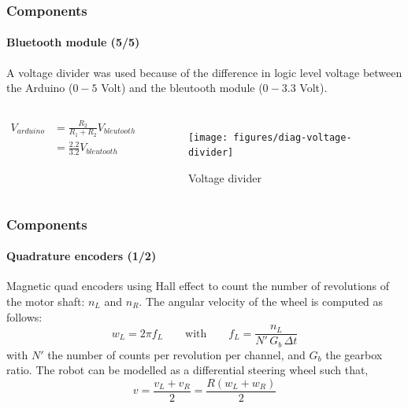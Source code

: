 \documentclass[10pt]{beamer}
\begin{document}
\begin{frame}
\frametitle{Components}
\framesubtitle{Bluetooth module (5/5)}
A voltage divider was used because of the difference in logic level voltage between the Arduino ($0-5$ Volt) and the bleutooth module ($0-3.3$ Volt). 
\begin{columns}[c]

\begin{align*} 
V_{arduino} &=  \frac{R_2}{R_1+R_2}V_{bleutooth} \\[0.4cm]
 &=  \frac{2.2}{3.2}V_{bleutooth}
\end{align*}

\begin{figure}[hbtp]
\centering
\texttt{[image: figures/diag-voltage-divider]}
\caption{Voltage divider}
\end{figure}

\end{columns}
\end{frame}


\begin{frame}
\frametitle{Components}
\framesubtitle{Quadrature encoders (1/2)}
Magnetic quad encoders using Hall effect to count the number of revolutions of the motor shaft: $n_L$ and $n_R$. The angular velocity of the wheel is computed as follows:
$$ 
w_L = 2\pi f_L
\qquad\text{with}\qquad	
f_L = \frac{n_L}{N' \, G_b \, \Delta{t} }
$$
with $N'$ the number of counts per revolution per channel, and $G_b$ the gearbox ratio. The robot can be modelled as a differential steering wheel such that,
$$ 
v = \frac{v_L + v_R}{2} = \frac{R(w_L + w_R)}{2}
$$
\end{frame}

\end{document}
